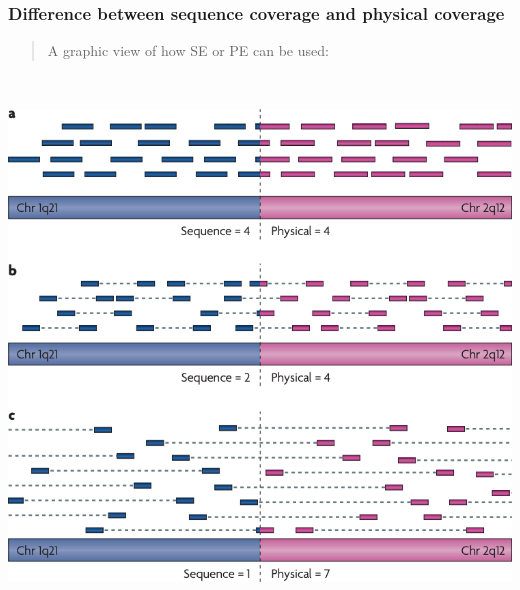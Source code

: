 \hypertarget{difference-between-sequence-coverage-and-physical-coverage}{%
\subsubsection{Difference between sequence coverage and physical
coverage}\label{difference-between-sequence-coverage-and-physical-coverage}}

\begin{quote}
A graphic view of how SE or PE can be used:
\end{quote}

\includegraphics[width=5.99692in,height=5.63875in]{image15.png}

